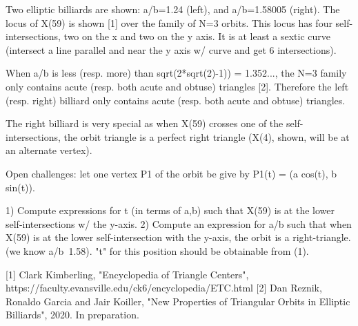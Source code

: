 Two elliptic billiards are shown: a/b=1.24 (left), and a/b=1.58005 (right). The locus of X(59) is shown [1] over the family of N=3 orbits. This locus has four self-intersections, two on the x and two on the y axis. It is at least a sextic curve (intersect a line parallel and near the y axis w/ curve and get 6 intersections).

When a/b is less (resp. more) than sqrt(2*sqrt(2)-1)) = 1.352..., the N=3 family only contains acute (resp. both acute and obtuse) triangles [2]. Therefore the left (resp. right) billiard only contains acute (resp. both acute and obtuse) triangles.

The right billiard is very special as when X(59) crosses one of the self-intersections, the orbit triangle is a perfect right triangle (X(4), shown, will be at an alternate vertex).

Open challenges: let one vertex P1 of the orbit be give by P1(t) = (a cos(t), b sin(t)).

1) Compute expressions for t (in terms of a,b) such that X(59) is at the lower self-intersections w/ the y-axis.
2)  Compute an expression for a/b such that when X(59) is at the lower self-intersection with the y-axis, the orbit is a right-triangle. (we know a/b~1.58). "t" for this position should be obtainable from (1).

[1] Clark Kimberling, "Encyclopedia of Triangle Centers", https://faculty.evansville.edu/ck6/encyclopedia/ETC.html
[2] Dan Reznik, Ronaldo Garcia and Jair Koiller, "New Properties of Triangular Orbits in Elliptic Billiards", 2020. In preparation.